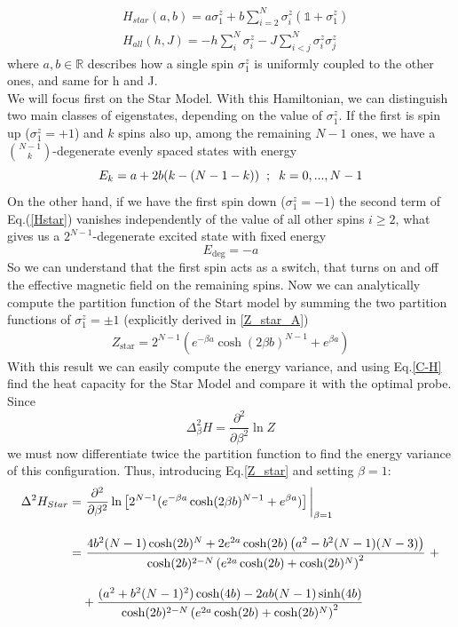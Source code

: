 \documentclass{article}
\begin{document}
\begin{align}
    &H_{star}(a,b)=a\sigma_1^z + b\sum_{i=2}^{N}\sigma_i^z(\mathbb{1}+\sigma_1^z)
    \label{Hstar}\\
    &H_{all}(h,J)=-h\sum_i^N\sigma_i^z-J\sum_{i<j}^N\sigma_i^z \sigma_j^z
    \label{H_all}
\end{align}
where $a,b\in\mathbb{R}$ describes how a single spin $\sigma_1^z$ is uniformly coupled to the other ones, and same for h and J.\\
We will focus first on the Star Model. With this Hamiltonian, we can distinguish two main classes of eigenstates, depending on the value of $\sigma_1^z$. If the first is spin up  ($\sigma_1^z=+1$) and $k$ spins also up, among the remaining $N-1$ ones, we have a $\binom{N-1}{k}$-degenerate evenly spaced states with energy
\begin{equation}
    E_k=a+2b(k-(N-1-k))\hspace{0.2cm};\hspace{0.2cm}k=0,...,N-1
\end{equation}
On the other hand, if we have the first spin down ($\sigma_1^z=-1$) the second term of Eq.(\ref{Hstar}) vanishes independently of the value of all other spins $i\geq2$, what gives us a $2^{N-1}$-degenerate excited state with fixed energy
\begin{equation}
    E_{\text{deg}}=-a
\end{equation}
So we can understand that the first spin acts as a switch, that turns on and off the effective magnetic field on the remaining spins. Now we can analytically compute the partition function of the Start model by summing the two partition functions of $\sigma_1^z=\pm1$ (explicitly derived in \ref{Z_star_A})
\begin{align}
    Z_{\text{star}}=2^{N-1}(e^{-\beta a}\cosh(2\beta b )^{N-1}+e^{\beta a})
    \label{Z_star}
\end{align}
With this result we can easily compute the energy variance, and using Eq.\eqref{C-H} find the heat capacity for the Star Model and compare it with the optimal probe. Since
\begin{equation}
    \Delta^2_\beta H=\frac{\partial^2}{\partial\beta^2}\ln Z
    \label{EnergyVariance}
\end{equation}
we must now differentiate twice the partition function to find the energy variance of this configuration. Thus, introducing Eq.\eqref{Z_star} and setting $\beta=1$:
\begin{align}
   \Delta^2H_{Star} =&\,\, \frac{\partial^2}{\partial\beta^2} \ln\left[2^{N-1}(e^{-\beta a}\cosh(2\beta b )^{N-1}+e^{\beta a})\right]\bigg|_{\beta=1} \\[10pt]
   =&\,\,\frac{4b^2 (N-1) \cosh(2b)^N + 2e^{2a} \cosh(2b) \left( a^2 - b^2 (N-1)(N-3)\right)}{\cosh(2b)^{2-N} \left( e^{2a} \cosh(2b) + \cosh(2b)^N \right)^2}\,\,+\notag\\[10pt]
   &+ \frac{(a^2 + b^2 (N-1)^2) \cosh(4b) - 2ab(N-1) \sinh(4b)}{\cosh(2b)^{2-N} \left( e^{2a} \cosh(2b) + \cosh(2b)^N \right)^2}
   \label{Cstar}
\end{align}
\end{document}
